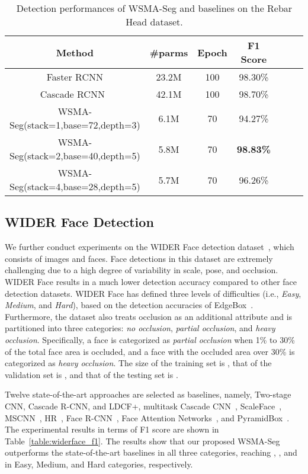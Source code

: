 \documentclass{article}
\begin{document}
\begin{table*}[!t]
  \caption{Detection performances of WSMA-Seg and baselines on the Rebar Head dataset.\label{table:rebar}}
  
  \smallskip 
  \centering
  \begin{tabular}{|c|c|c|c|c|c|c|}
  \hline
  Method&\#parms&Epoch&F1 Score\\ \hline
  Faster RCNN&23.2M&100&98.30\%\\\hline
  Cascade RCNN~\cite{cai2018cascade}&42.1M&100&98.70\%\\\hline
  WSMA-Seg(stack=1,base=72,depth=3)&6.1M&70&94.27\%\\\hline
  WSMA-Seg(stack=2,base=40,depth=5)&5.8M&70&\textbf{98.83\%}\\\hline
  WSMA-Seg(stack=4,base=28,depth=5)&5.7M&70&96.26\%\\\hline
  \end{tabular}
\end{table*}

\subsection{WIDER Face Detection}
We further conduct experiments on the WIDER Face detection dataset~\cite{yang2016wider}, which consists of  images and  faces. Face detections in this dataset are extremely challenging due to a high degree of variability in scale, pose, and occlusion. WIDER Face results in a much lower detection accuracy compared to other face detection datasets. WIDER Face has defined three levels of difficulties (i.e., \textit{Easy}, \textit{Medium}, and \textit{Hard}),  based on the detection accuracies of EdgeBox~\cite{zitnick2014edge}. 
Furthermore, the dataset also treats occlusion as an additional attribute and is partitioned into three categories: \textit{no occlusion}, \textit{partial occlusion}, and \textit{heavy occlusion}. Specifically, a face is categorized as \textit{partial occlusion} when 1\% to 30\% of the total face area is occluded, and a face with the occluded area over 30\% is categorized as \textit{heavy occlusion}. The size of the training set is , that of the validation set is , and that of the testing set is .


Twelve state-of-the-art approaches are selected as baselines, namely, Two-stage CNN, Cascade R-CNN, and LDCF+\cite{ohn2016boost}, multitask Cascade CNN~\cite{zhang2016joint}, ScaleFace~\cite{yang2017face}, MSCNN~\cite{cai2016unified}, HR~\cite{hu2017finding}, Face R-CNN~\cite{wang2017detecting}, Face Attention Networks~\cite{wang2017face}, and PyramidBox~\cite{tang2018pyramidbox}.
The experimental results in terms of F1 score are shown in Table~\ref{table:widerface_f1}.
The results show that our proposed WSMA-Seg outperforms the state-of-the-art baselines in all three categories, reaching , , and  in Easy, Medium, and Hard categories, respectively.
\end{document}

